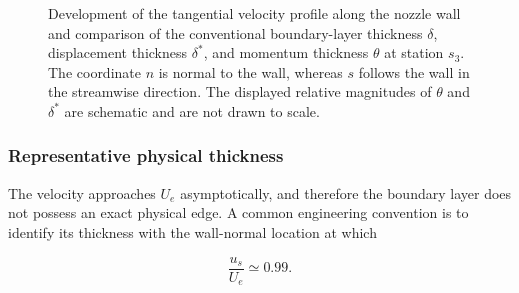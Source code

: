 \begin{figure}[htbp]

\caption{Development of the tangential velocity profile along the nozzle
wall and comparison of the conventional boundary-layer thickness
\(\delta\), displacement thickness \(\delta^*\), and momentum thickness
\(\theta\) at station \(s_3\). The coordinate \(n\) is normal to the wall,
whereas \(s\) follows the wall in the streamwise direction. The displayed
relative magnitudes of \(\theta\) and \(\delta^*\) are schematic and are not
drawn to scale.}

\label{fig:BL_velocity_growth}
\end{figure}
\subsubsection{Representative physical thickness}

The velocity approaches \(U_e\) asymptotically, and therefore the boundary
layer does not possess an exact physical edge. A common engineering convention
is to identify its thickness with the wall-normal location at which

\begin{equation}
    \frac{u_s}{U_e}\simeq0.99.
    \label{eq:delta_99_definition}
\end{equation}

